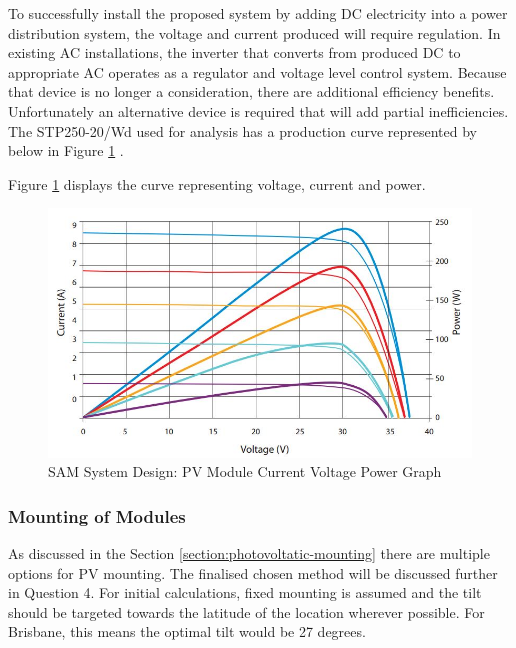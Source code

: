 To successfully install the proposed system by adding DC electricity into a power distribution system, the voltage and current produced will require regulation. In existing AC installations, the inverter that converts from produced DC to appropriate AC operates as a regulator and voltage level control system. Because that device is no longer a consideration, there are additional efficiency benefits. Unfortunately an alternative device is required that will add partial inefficiencies. The STP250-20/Wd used for analysis has a production curve represented by below in Figure \ref{fig:PV-Module-Spec-Graph} \cite{website:SuntechModule}.
\newline

Figure \ref{fig:PV-Module-Spec-Graph} displays the curve representing voltage, current and power.

\begin{figure}[H]
	\hfill\includegraphics[width = 120mm]{images/sam/pv-module-current-voltage-graph}\hspace*{\fill}
	\caption{SAM System Design: PV Module Current Voltage Power Graph \cite{website:SuntechModule}} 
	\label{fig:PV-Module-Spec-Graph}
\end{figure}


\subsubsection{Mounting of Modules}

As discussed in the Section \ref{section:photovoltatic-mounting} there are multiple options for PV mounting. The finalised chosen method will be discussed further in Question 4. For initial calculations, fixed mounting is assumed and the tilt should be targeted towards the latitude of the location wherever possible. For Brisbane, this means the optimal tilt would be 27 degrees.   


